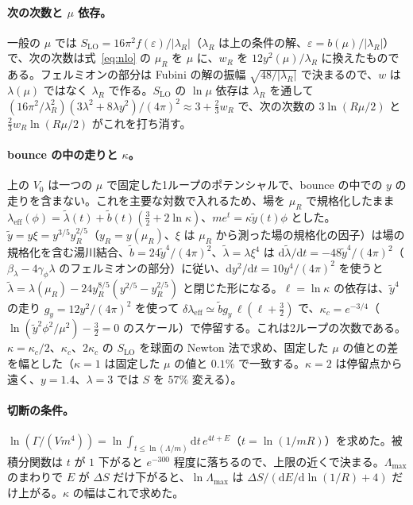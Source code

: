 \documentclass[a4paper,10pt]{ltjsarticle}
\newcommand{\dd}{\mathrm{d}}
\begin{document}
\paragraph{次の次数と $\mu$ 依存。}一般の $\mu$ では $S_{\mathrm{LO}}=16\pi^2f(\varepsilon)/|\lambda_R|$（$\lambda_R$ は上の条件の解、$\varepsilon=b(\mu)/|\lambda_R|$）で、次の次数は式~\eqref{eq:nlo} の $\mu_R$ を $\mu$ に、$w_R$ を $12y^2(\mu)/\lambda_R$ に換えたものである。フェルミオンの部分は Fubini の解の振幅 $\sqrt{48/|\lambda_R|}$ で決まるので、$w$ は $\lambda(\mu)$ ではなく $\lambda_R$ で作る。$S_{\mathrm{LO}}$ の $\ln\mu$ 依存は $\lambda_R$ を通して $(16\pi^2/\lambda_R^2)(3\lambda^2+8\lambda y^2)/(4\pi)^2\approx3+\frac23w_R$ で、次の次数の $3\ln(R\mu/2)$ と $\frac23w_R\ln(R\mu/2)$ がこれを打ち消す。

\paragraph{bounce の中の走りと $\kappa$。}上の $V_0$ は一つの $\mu$ で固定した1ループのポテンシャルで、bounce の中での $y$ の走りを含まない。これを主要な対数で入れるため、場を $\mu_R$ で規格化したまま $\lambda_{\mathrm{eff}}(\phi)=\tilde\lambda(t)+\tilde b(t)(\frac32+2\ln\kappa)$、$me^t=\kappa\tilde y(t)\phi$ とした。$\tilde y=y\xi=y^{3/5}y_R^{2/5}$（$y_R=y(\mu_R)$、$\xi$ は $\mu_R$ から測った場の規格化の因子）は場の規格化を含む湯川結合、$\tilde b=24\tilde y^4/(4\pi)^2$、$\tilde\lambda=\lambda\xi^4$ は $\dd\tilde\lambda/\dd t=-48\tilde y^4/(4\pi)^2$（$\beta_\lambda-4\gamma_\phi\lambda$ のフェルミオンの部分）に従い、$\dd y^2/\dd t=10y^4/(4\pi)^2$ を使うと $\tilde\lambda=\lambda(\mu_R)-24y_R^{8/5}(y^{2/5}-y_R^{2/5})$ と閉じた形になる。$\ell=\ln\kappa$ の依存は、$\tilde y^4$ の走り $g_y=12y^2/(4\pi)^2$ を使って $\delta\lambda_{\mathrm{eff}}\simeq\tilde bg_y\,\ell(\ell+\frac32)$ で、$\kappa_c=e^{-3/4}$（$\ln(\tilde y^2\phi^2/\mu^2)-\frac32=0$ のスケール）で停留する。これは2ループの次数である。$\kappa=\kappa_c/2$、$\kappa_c$、$2\kappa_c$ の $S_{\mathrm{LO}}$ を球面の Newton 法で求め、固定した $\mu$ の値との差を幅とした（$\kappa=1$ は固定した $\mu$ の値と $0.1\%$ で一致する。$\kappa=2$ は停留点から遠く、$y=1.4$、$\lambda=3$ では $S$ を $57\%$ 変える）。

\paragraph{切断の条件。}$\ln(\Gamma/(Vm^4))=\ln\int_{t\le\ln(\Lambda/m)}\dd t\,e^{4t+E}$（$t=\ln(1/mR)$）を求めた。被積分関数は $t$ が $1$ 下がると $e^{-300}$ 程度に落ちるので、上限の近くで決まる。$\Lambda_{\max}$ のまわりで $E$ が $\Delta S$ だけ下がると、$\ln\Lambda_{\max}$ は $\Delta S/(\dd E/\dd\ln(1/R)+4)$ だけ上がる。$\kappa$ の幅はこれで求めた。
\end{document}
